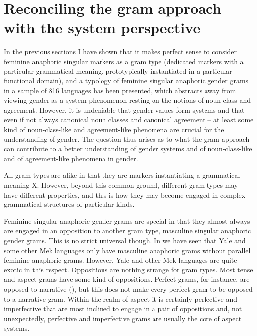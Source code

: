 \documentclass[output=collectionpaper]{langsci/langscibook}
\begin{document}
\section{Reconciling the gram approach with the system perspective}
\label{sec:BW:6}

In the previous sections I have shown that it makes perfect sense to consider feminine anaphoric singular markers as a gram type (dedicated markers with a particular grammatical meaning, prototypically instantiated in a particular functional domain), and a typology of feminine singular anaphoric gender grams in a sample of 816 languages has been presented, which abstracts away from viewing gender as a system phenomenon resting on the notions of noun class and agreement. However, it is undeniable that gender values form systems and that – even if not always canonical noun classes and canonical agreement – at least some kind of noun-class-like and agreement-like phenomena are crucial for the understanding of gender. The question thus arises as to what the gram approach can contribute to a better understanding of gender systems and of noun-class-like and of agreement-like phenomena in gender.

All gram types are alike in that they are markers instantiating a grammatical meaning X. However, beyond this common ground, different gram types may have different properties, and this is how they may become engaged in complex grammatical structures of particular kinds.

Feminine singular anaphoric gender grams are special in that they almost always are engaged in an opposition to another gram type, masculine singular anaphoric gender grams. This is no strict universal though. In  we have seen that Yale and some other Mek languages only have masculine anaphoric grams without parallel feminine anaphoric grams. However, Yale and other Mek languages are quite exotic in this respect. Oppositions are nothing strange for gram types. Most tense and aspect grams have some kind of oppositions. Perfect grams, for instance, are opposed to narrative (\citealt[327]{Dahl2016}), but this does not make every perfect gram to be opposed to a narrative gram. Within the realm of aspect it is certainly perfective and imperfective that are most inclined to engage in a pair of oppositions and, not unexpectedly, perfective and imperfective grams are usually the core of aspect systems.
\end{document}
